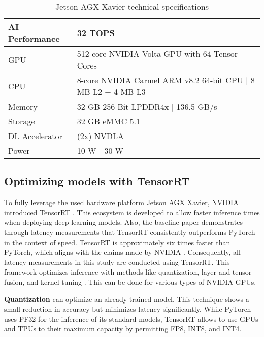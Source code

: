 \begin{table}[H]
    \centering
    \begin{tabular}{|l|l|}
        \hline
        AI Performance & 32 TOPS\\
        \hline
        \ac{GPU} & 512-core NVIDIA Volta GPU with 64 Tensor Cores\\
        \hline
        \ac{CPU} & 8-core NVIDIA Carmel ARM v8.2 64-bit CPU | 8 MB L2 + 4 MB L3\\
        \hline
        Memory & 32 GB 256-Bit LPDDR4x | 136.5 GB/s\\
        \hline
        Storage & 32 GB eMMC 5.1\\
        \hline
        DL Accelerator & (2x) NVDLA\\
        \hline
        Power & 10 W - 30 W\\
        \hline
    \end{tabular}
    \caption{Jetson AGX Xavier technical specifications \cite{nvidia_jetson_agx_xavier_datasheet}}
    \label{tab:jetson_AGX_xavier_specs}
\end{table}

\subsection{Optimizing models with TensorRT}

To fully leverage the used hardware platform Jetson AGX Xavier, NVIDIA introduced TensorRT \cite{nvidia_tensorrt}.
This ecosystem is developed to allow faster inference times when deploying deep learning models.
Also, the baseline paper \cite{tepNet2024} demonstrates through latency measurements that TensorRT consistently outperforms PyTorch in the context of speed.
TensorRT is approximately six times faster than PyTorch, which aligns with the claims made by NVIDIA \cite{tepNet2024} \cite{nvidia_tensorrt}.
Consequently, all latency measurements in this study are conducted using TensorRT.
This framework optimizes inference with methods like quantization, layer and tensor fusion, and kernel tuning \cite{nvidia_tensorrt}.
This can be done for various types of NVIDIA \ac{GPU}s.

\vspace{0.8cm}

\noindent\textbf{Quantization} can optimize an already trained model.
This technique shows a small reduction in accuracy but minimizes latency significantly.
While PyTorch uses PF32 for the inference of its standard models, TensorRT allows to use \ac{GPU}s and \ac{TPU}s to their maximum capacity by permitting FP8, INT8, and INT4.

